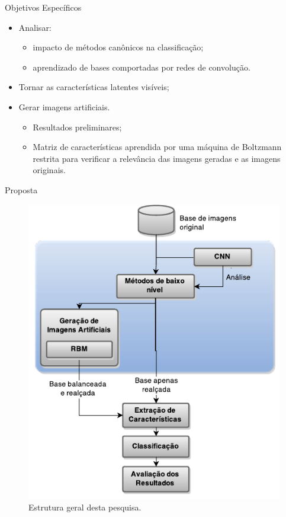 \documentclass{beamer}
\begin{document}
\begin{frame}{Objetivos Específicos}
\setlength\leftmargini{1em}
\justifying
    \begin{itemize}
      \item Analisar: 
        \begin{itemize}
          \item impacto de métodos canônicos na classificação;
          \item aprendizado de bases comportadas por redes de convolução.
        \end{itemize}
      \item Tornar as características latentes visíveis;%
      \item Gerar imagens artificiais. 
      \pause
        \begin{itemize}
          \item Resultados preliminares;
          \item Matriz de características aprendida por uma máquina de Boltzmann restrita para verificar a relevância das imagens geradas e as imagens originais.
        \end{itemize}
    \end{itemize}
\end{frame}
\begin{frame}{Proposta}
\begin{figure}
    \includegraphics[height=0.75\textheight]{figuras/geral.pdf}
    \caption{Estrutura geral desta pesquisa.}
\end{figure}
\end{frame}
\end{document}
